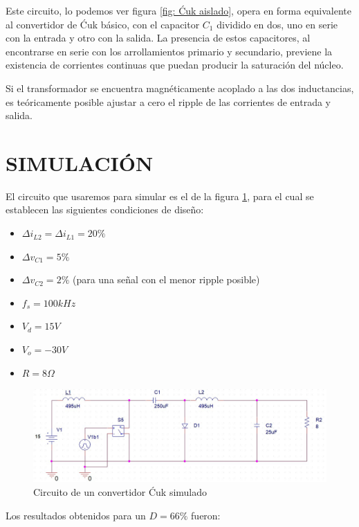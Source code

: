 \documentclass[conference]{IEEEtran}
\begin{document}
Este circuito, lo podemos ver figura \ref{fig: Ćuk aislado}, opera en forma equivalente al convertidor de Ćuk básico, con el capacitor $C_1$ dividido en dos, uno en serie con la entrada y otro con la salida. La presencia de estos capacitores, al encontrarse en serie con los arrollamientos primario y secundario, previene la existencia de corrientes continuas que puedan producir la saturación del núcleo.

Si el transformador se encuentra magnéticamente acoplado a las dos inductancias, es teóricamente posible ajustar a cero el ripple de las corrientes de entrada y salida.

\section{SIMULACIÓN}
El circuito que usaremos para simular es el de la figura \ref{fig: Ćuk simulado}, para el cual se establecen las siguientes condiciones de diseño:
\begin{itemize}
    \item $\Delta i_{L2}=\Delta i_{L1}=20\%$
    \item $\Delta v_{C1}=5\%$
    \item $\Delta v_{C2}=2\%$ (para una señal con el menor ripple posible)
    \item $f_s=100kHz$
    \item $V_{d}=15V$
    \item $V_o=-30V$
    \item $R=8\Omega$
\end{itemize}

\begin{figure}[h!]
    \centering
    \includegraphics[scale=0.3]{imagenes/cuk-simulado.jpg}
    \caption{Circuito de un convertidor Ćuk simulado}
    \label{fig: Ćuk simulado}
\end{figure}

Los resultados obtenidos para un $D=66\%$ fueron:
\end{document}

